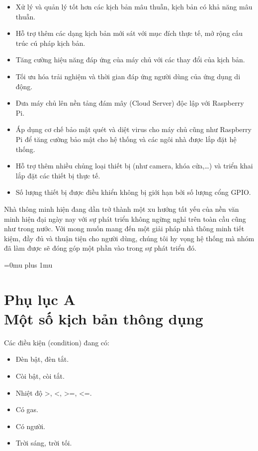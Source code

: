 \documentclass[12pt,a4paper,oneside]{extbook}
\begin{document}
\begin{itemize}[topsep=1mm,itemsep=-0.5mm]
\item Xử lý và quản lý tốt hơn các kịch bản mâu thuẫn, kịch bản có khả năng mâu thuẫn.
\item Hỗ trợ thêm các dạng kịch bản mới sát với mục đích thực tế, mở rộng cấu trúc cú pháp kịch bản.
\item Tăng cường hiệu năng đáp ứng của máy chủ với các thay đổi của kịch bản.
\item Tối ưu hóa trải nghiệm và thời gian đáp ứng người dùng của ứng dụng di động.
\item Đưa máy chủ lên nền tảng đám mây (Cloud Server) độc lập với Raspberry Pi.
\item Áp dụng cơ chế bảo mật quét và diệt virus cho máy chủ cũng như Raspberry Pi để tăng cường bảo mật cho hệ thống và các ngôi nhà được lắp đặt hệ thống.
\item Hỗ trợ thêm nhiều chủng loại thiết bị (như camera, khóa cửa,\dots) và triển khai lắp đặt các thiết bị thực tế.
\item Số lượng thiết bị được điều khiển không bị giới hạn bởi số lượng cổng GPIO.
\vspace{1mm}
\end{itemize}

\noindent
Nhà thông minh hiện đang dần trở thành một xu hướng tất yếu của nền văn minh hiện đại ngày nay với sự phát triển không ngừng nghỉ trên toàn cầu cũng như trong nước. Với mong muốn mang đến một giải pháp nhà thông minh tiết kiệm, đầy đủ và thuận tiện cho người dùng, chúng tôi hy vọng hệ thống mà nhóm đã làm được sẽ đóng góp một phần vào trong sự phát triển đó.


\newpage
\Urlmuskip=0mu plus 1mu\relax




\chapter*{Phụ lục A \\Một số kịch bản thông dụng}
\thispagestyle{plain}

Các điều kiện (condition) đang có:

\begin{itemize}[topsep=1mm,itemsep=-0.5mm]
\item Đèn bật, đèn tắt.
\item Còi bật, còi tắt.
\item Nhiệt độ >, <, >=, <=.
\item Có gas.
\item Có người.
\item Trời sáng, trời tối.
\vspace{1mm}
\end{itemize}
\end{document}
